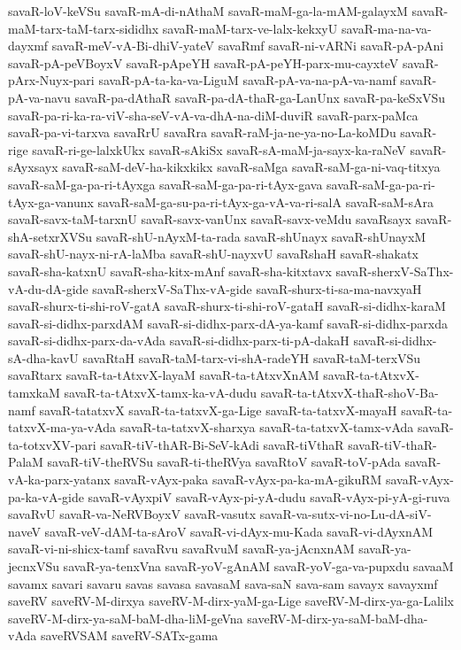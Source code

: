 {savaR-loV-keVSu
savaR-mA-di-nAthaM
savaR-maM-ga-la-mAM-galayxM
savaR-maM-tarx-taM-tarx-sididhx
savaR-maM-tarx-ve-lalx-kekxyU
savaR-ma-na-va-dayxmf
savaR-meV-vA-Bi-dhiV-yateV
savaRmf
savaR-ni-vARNi
savaR-pA-pAni
savaR-pA-peVBoyxV
savaR-pApeYH
savaR-pA-peYH-parx-mu-cayxteV
savaR-pArx-Nuyx-pari
savaR-pA-ta-ka-va-LiguM
savaR-pA-va-na-pA-va-namf
savaR-pA-va-navu
savaR-pa-dAthaR
savaR-pa-dA-thaR-ga-LanUnx
savaR-pa-keSxVSu
savaR-pa-ri-ka-ra-viV-sha-seV-vA-va-dhA-na-diM-duviR
savaR-parx-paMca
savaR-pa-vi-tarxva
savaRrU
savaRra
savaR-raM-ja-ne-ya-no-La-koMDu
savaR-rige
savaR-ri-ge-lalxkUkx
savaR-sAkiSx
savaR-sA-maM-ja-sayx-ka-raNeV
savaR-sAyxsayx
savaR-saM-deV-ha-kikxkikx
savaR-saMga
savaR-saM-ga-ni-vaq-titxya
savaR-saM-ga-pa-ri-tAyxga
savaR-saM-ga-pa-ri-tAyx-gava
savaR-saM-ga-pa-ri-tAyx-ga-vanunx
savaR-saM-ga-su-pa-ri-tAyx-ga-vA-va-ri-salA
savaR-saM-sAra
savaR-savx-taM-tarxnU
savaR-savx-vanUnx
savaR-savx-veMdu
savaRsayx
savaR-shA-setxrXVSu
savaR-shU-nAyxM-ta-rada
savaR-shUnayx
savaR-shUnayxM
savaR-shU-nayx-ni-rA-laMba
savaR-shU-nayxvU
savaRshaH
savaR-shakatx
savaR-sha-katxnU
savaR-sha-kitx-mAnf
savaR-sha-kitxtavx
savaR-sherxV-SaThx-vA-du-dA-gide
savaR-sherxV-SaThx-vA-gide
savaR-shurx-ti-sa-ma-navxyaH
savaR-shurx-ti-shi-roV-gatA
savaR-shurx-ti-shi-roV-gataH
savaR-si-didhx-karaM
savaR-si-didhx-parxdAM
savaR-si-didhx-parx-dA-ya-kamf
savaR-si-didhx-parxda
savaR-si-didhx-parx-da-vAda
savaR-si-didhx-parx-ti-pA-dakaH
savaR-si-didhx-sA-dha-kavU
savaRtaH
savaR-taM-tarx-vi-shA-radeYH
savaR-taM-terxVSu
savaRtarx
savaR-ta-tAtxvX-layaM
savaR-ta-tAtxvXnAM
savaR-ta-tAtxvX-tamxkaM
savaR-ta-tAtxvX-tamx-ka-vA-dudu
savaR-ta-tAtxvX-thaR-shoV-Ba-namf
savaR-tatatxvX
savaR-ta-tatxvX-ga-Lige
savaR-ta-tatxvX-mayaH
savaR-ta-tatxvX-ma-ya-vAda
savaR-ta-tatxvX-sharxya
savaR-ta-tatxvX-tamx-vAda
savaR-ta-totxvXV-pari
savaR-tiV-thAR-Bi-SeV-kAdi
savaR-tiVthaR
savaR-tiV-thaR-PalaM
savaR-tiV-theRVSu
savaR-ti-theRVya
savaRtoV
savaR-toV-pAda
savaR-vA-ka-parx-yatanx
savaR-vAyx-paka
savaR-vAyx-pa-ka-mA-gikuRM
savaR-vAyx-pa-ka-vA-gide
savaR-vAyxpiV
savaR-vAyx-pi-yA-dudu
savaR-vAyx-pi-yA-gi-ruva
savaRvU
savaR-va-NeRVBoyxV
savaR-vasutx
savaR-va-sutx-vi-no-Lu-dA-siV-naveV
savaR-veV-dAM-ta-sAroV
savaR-vi-dAyx-mu-Kada
savaR-vi-dAyxnAM
savaR-vi-ni-shicx-tamf
savaRvu
savaRvuM
savaR-ya-jAcnxnAM
savaR-ya-jecnxVSu
savaR-ya-tenxVna
savaR-yoV-gAnAM
savaR-yoV-ga-va-pupxdu
savaaM
savamx
savari
savaru
savas
savasa
savasaM
sava-saN
sava-sam
savayx
savayxmf
saveRV
saveRV-M-dirxya
saveRV-M-dirx-yaM-ga-Lige
saveRV-M-dirx-ya-ga-Lalilx
saveRV-M-dirx-ya-saM-baM-dha-liM-geVna
saveRV-M-dirx-ya-saM-baM-dha-vAda
saveRVSAM
saveRV-SATx-gama
}
